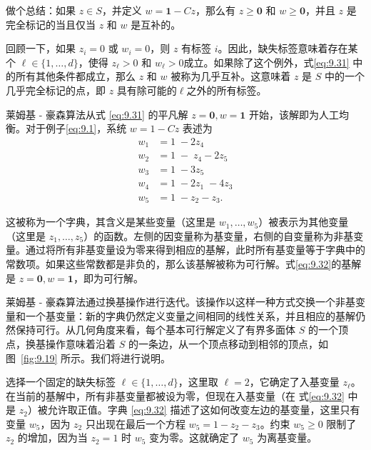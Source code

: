 做个总结：如果 \(z \in  S\)，并定义 \(w = \mathbf{1} - {Cz}\)，那么有 \(z \geq  \mathbf{0}\) 和 \(w \geq  \mathbf{0}\)，并且 \(z\) 是完全标记的当且仅当 \(z\) 和 \(w\) 是互补的。

回顾一下，如果 \({z}_{i} = 0\) 或 \({w}_{i} = 0\)，则 \(z\) 有标签 \(i\)。因此，缺失标签意味着存在某个 \(\ell  \in  \{ 1,\ldots,d\}\)，使得 \({z}_{\ell } > 0\) 和 \({w}_{\ell } > 0\)成立。如果除了这个例外，式\eqref{eq:9.31} 中的所有其他条件都成立，那么 \(z\) 和 \(w\) 被称为几乎互补。这意味着 \(z\) 是 \(S\) 中的一个几乎完全标记的点，即 \(z\) 具有除可能的\(\ell\)之外的所有标签。


莱姆基 - 豪森算法从式 \eqref{eq:9.31}  的平凡解 \(z = \mathbf{0},w = \mathbf{1}\) 开始，该解即为人工均衡。对于例子\eqref{eq:9.1}，系统 \(w = 1 - {Cz}\) 表述为
\begin{equation}
\label{eq:9.32}
\begin{aligned}
{w}_{1} & = 1\; - 2{z}_{4} \\
{w}_{2} & = 1\; - \;{z}_{4} - 2{z}_{5} \\
{w}_{3} & = 1\; - 3{z}_{5} \\
{w}_{4} & = 1\; - 2{z}_{1}\; - 4{z}_{3}  \\
{w}_{5} & = 1\; - {z}_{2} - {z}_{3}.
\end{aligned}
\end{equation}

这被称为一个字典，其含义是某些变量（这里是 \(w_{1},\ldots,w_{5}\)）被表示为其他变量（这里是 \(z_{1},\ldots,z_{5}\)）的函数。左侧的因变量称为基变量，右侧的自变量称为非基变量。通过将所有非基变量设为零来得到相应的基解，此时所有基变量等于字典中的常数项。如果这些常数都是非负的，那么该基解被称为可行解。式\eqref{eq:9.32}的基解是 \(z = \mathbf{0},w = \mathbf{1}\)，即为可行解。


莱姆基 - 豪森算法通过换基操作进行迭代。该操作以这样一种方式交换一个非基变量和一个基变量：新的字典仍然定义变量之间相同的线性关系，并且相应的基解仍然保持可行。从几何角度来看，每个基本可行解定义了有界多面体 \(S\) 的一个顶点，换基操作意味着沿着 \(S\) 的一条边，从一个顶点移动到相邻的顶点，如图~\ref{fig:9.19} 所示。我们将进行说明。


选择一个固定的缺失标签 \(\ell  \in  \{ 1,\ldots, d\}\)，这里取 \(\ell  = 2\)，它确定了入基变量 \({z}_{\ell }\)。在当前的基解中，所有非基变量都被设为零，但现在入基变量（在 式\eqref{eq:9.32}  中是 \({z}_{2}\)）被允许取正值。字典 \eqref{eq:9.32} 描述了这如何改变左边的基变量，这里只有变量 \({w}_{5}\)，因为 \({z}_{2}\) 只出现在最后一个方程 \({w}_{5} = 1 - {z}_{2} - {z}_{3}\)。约束 \({w}_{5} \geq  0\) 限制了 \({z}_{2}\) 的增加，因为当 \({z}_{2} = 1\) 时 \({w}_{5}\) 变为零。这就确定了 \({w}_{5}\) 为离基变量。



